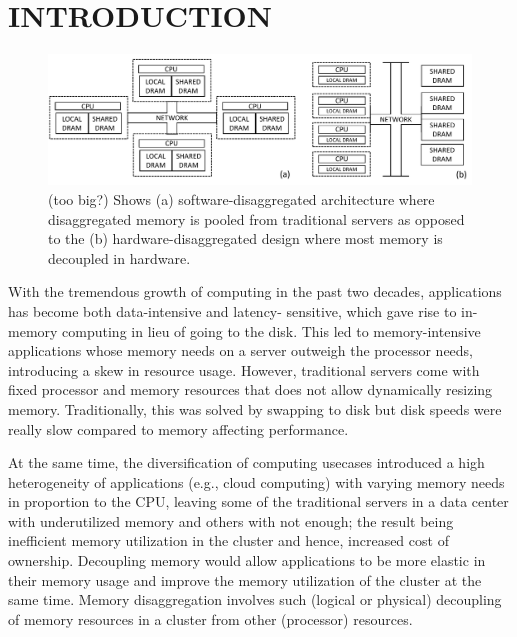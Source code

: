 \section{INTRODUCTION}
\label{sec:intro}

\begin{figure}[h!]
    \centering
    \includegraphics[width=.9\linewidth]{fig/architecture.pdf}
    \caption{(too big?) Shows (a) software-disaggregated architecture where disaggregated memory is pooled from 
    traditional servers as opposed to the (b) hardware-disaggregated
    design where most memory is decoupled in hardware.}
    \label{fig:architecture}
\end{figure}

With the tremendous growth of computing in the past two decades, 
applications has become both data-intensive and latency-
sensitive, which gave rise to in-memory computing in lieu 
of going to the disk. This led to memory-intensive 
applications whose memory needs on a server outweigh the 
processor needs, introducing a skew in resource usage.
However, traditional servers come with fixed processor 
and memory resources that does not allow dynamically
resizing memory. Traditionally, this was solved by swapping 
to disk but disk speeds were really slow compared to memory 
affecting performance. 

At the same time, the diversification of computing usecases 
introduced a high heterogeneity of applications (e.g., cloud 
computing) with varying memory needs in proportion to 
the CPU, leaving some of the traditional servers in a data center  
with underutilized memory and others with not enough; the result
being inefficient memory utilization in the cluster and hence,
increased cost of ownership. Decoupling memory would allow 
applications to be more elastic in their memory usage and 
improve the memory utilization of the cluster at the same time.
Memory disaggregation involves such (logical or physical) 
decoupling of memory resources in a cluster from other 
(processor) resources. 

